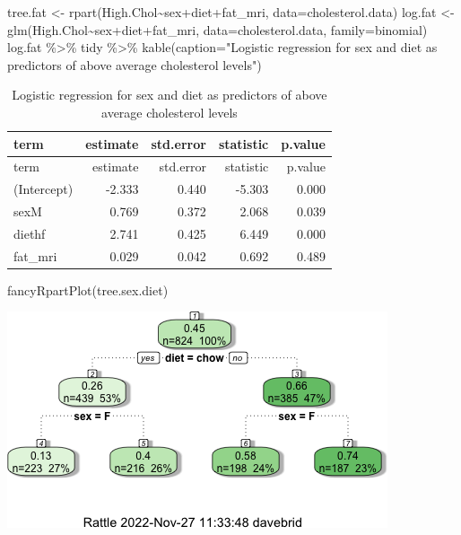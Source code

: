 \documentclass[
]{article}
\newenvironment{Shaded}{\begin{snugshade}}{\end{snugshade}}
\newcommand{\AttributeTok}[1]{\textcolor[rgb]{0.77,0.63,0.00}{#1}}
\newcommand{\FunctionTok}[1]{\textcolor[rgb]{0.00,0.00,0.00}{#1}}
\newcommand{\NormalTok}[1]{#1}
\newcommand{\OtherTok}[1]{\textcolor[rgb]{0.56,0.35,0.01}{#1}}
\newcommand{\SpecialCharTok}[1]{\textcolor[rgb]{0.00,0.00,0.00}{#1}}
\newcommand{\StringTok}[1]{\textcolor[rgb]{0.31,0.60,0.02}{#1}}
\begin{document}
\begin{Shaded}
\begin{Highlighting}[]
\NormalTok{tree.fat }\OtherTok{\textless{}{-}} \FunctionTok{rpart}\NormalTok{(High.Chol}\SpecialCharTok{\textasciitilde{}}\NormalTok{sex}\SpecialCharTok{+}\NormalTok{diet}\SpecialCharTok{+}\NormalTok{fat\_mri, }\AttributeTok{data=}\NormalTok{cholesterol.data)}
\NormalTok{log.fat }\OtherTok{\textless{}{-}} \FunctionTok{glm}\NormalTok{(High.Chol}\SpecialCharTok{\textasciitilde{}}\NormalTok{sex}\SpecialCharTok{+}\NormalTok{diet}\SpecialCharTok{+}\NormalTok{fat\_mri, }\AttributeTok{data=}\NormalTok{cholesterol.data, }\AttributeTok{family=}\StringTok{\textquotesingle{}binomial\textquotesingle{}}\NormalTok{)}
\NormalTok{log.fat }\SpecialCharTok{\%\textgreater{}\%}\NormalTok{ tidy }\SpecialCharTok{\%\textgreater{}\%} \FunctionTok{kable}\NormalTok{(}\AttributeTok{caption=}\StringTok{"Logistic regression for sex and diet as predictors of above average cholesterol levels"}\NormalTok{)}
\end{Highlighting}
\end{Shaded}

\begin{longtable}[]{@{}lrrrr@{}}
\caption{Logistic regression for sex and diet as predictors of above
average cholesterol levels}\tabularnewline
\toprule()
term & estimate & std.error & statistic & p.value \\
\midrule()
\endfirsthead
\toprule()
term & estimate & std.error & statistic & p.value \\
\midrule()
\endhead
(Intercept) & -2.333 & 0.440 & -5.303 & 0.000 \\
sexM & 0.769 & 0.372 & 2.068 & 0.039 \\
diethf & 2.741 & 0.425 & 6.449 & 0.000 \\
fat\_mri & 0.029 & 0.042 & 0.692 & 0.489 \\
\bottomrule()
\end{longtable}

\begin{Shaded}
\begin{Highlighting}[]
\FunctionTok{fancyRpartPlot}\NormalTok{(tree.sex.diet)}
\end{Highlighting}
\end{Shaded}

\includegraphics{figures/fat-tree-1.png}
\end{document}
